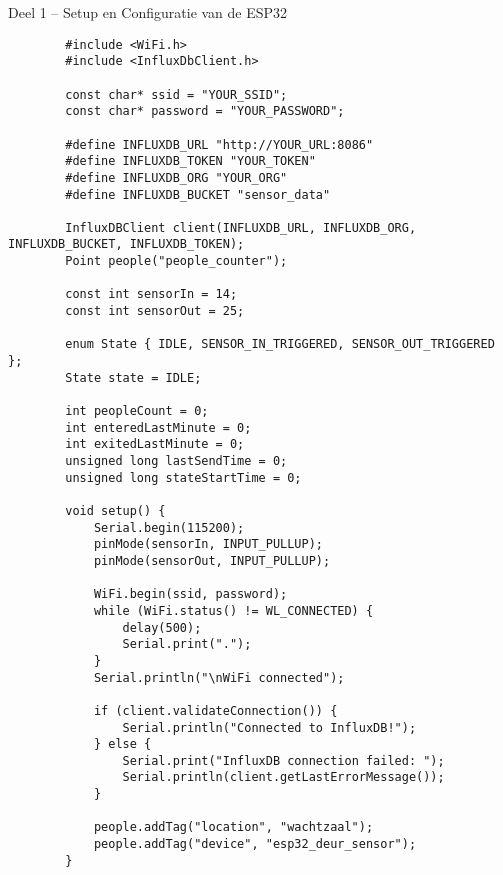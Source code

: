 \documentclass[dutch,dit,thesis]{hogentreport}
\begin{document}
   
\begin{listing}[H]
    \caption{Deel 1 – Setup en Configuratie van de ESP32}
    \label{lst:esp32_setup}
    \begin{verbatim}
        #include <WiFi.h>
        #include <InfluxDbClient.h>
        
        const char* ssid = "YOUR_SSID";
        const char* password = "YOUR_PASSWORD";
        
        #define INFLUXDB_URL "http://YOUR_URL:8086"
        #define INFLUXDB_TOKEN "YOUR_TOKEN"
        #define INFLUXDB_ORG "YOUR_ORG"
        #define INFLUXDB_BUCKET "sensor_data"
        
        InfluxDBClient client(INFLUXDB_URL, INFLUXDB_ORG, INFLUXDB_BUCKET, INFLUXDB_TOKEN);
        Point people("people_counter");
        
        const int sensorIn = 14;
        const int sensorOut = 25; 
       
        enum State { IDLE, SENSOR_IN_TRIGGERED, SENSOR_OUT_TRIGGERED };
        State state = IDLE;
        
        int peopleCount = 0;
        int enteredLastMinute = 0;
        int exitedLastMinute = 0;
        unsigned long lastSendTime = 0;
        unsigned long stateStartTime = 0;
        
        void setup() {
            Serial.begin(115200);
            pinMode(sensorIn, INPUT_PULLUP);
            pinMode(sensorOut, INPUT_PULLUP);
            
            WiFi.begin(ssid, password);
            while (WiFi.status() != WL_CONNECTED) {
                delay(500);
                Serial.print(".");
            }
            Serial.println("\nWiFi connected");
            
            if (client.validateConnection()) {
                Serial.println("Connected to InfluxDB!");
            } else {
                Serial.print("InfluxDB connection failed: ");
                Serial.println(client.getLastErrorMessage());
            }
            
            people.addTag("location", "wachtzaal");
            people.addTag("device", "esp32_deur_sensor");
        }
    \end{verbatim}
\end{listing}
\end{document}
